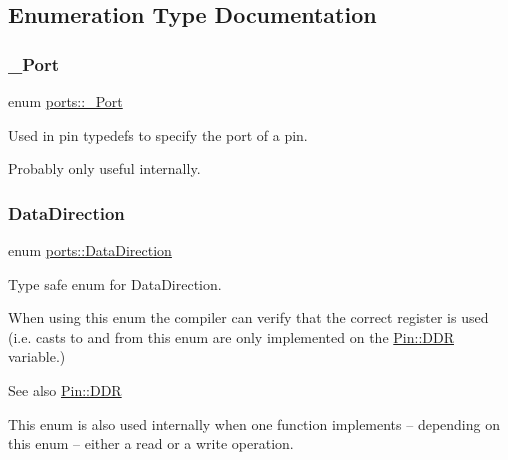 \subsection{Enumeration Type Documentation}
\hypertarget{namespaceports_a9949317f344930bd6ad1097e80c97b67}{}\label{namespaceports_a9949317f344930bd6ad1097e80c97b67} 
\subsubsection{\texorpdfstring{\+\_\+\+Port}{\_Port}}
{\footnotesize\ttfamily enum \hyperlink{namespaceports_a9949317f344930bd6ad1097e80c97b67}{ports\+::\+\_\+\+Port}\hspace{0.3cm}{\ttfamily [strong]}}



Used in pin {\ttfamily typedef}s to specify the port of a pin. 

Probably only useful internally. \hypertarget{namespaceports_a46987e78fa447129742fadda5eccafb4}{}\label{namespaceports_a46987e78fa447129742fadda5eccafb4} 
\subsubsection{\texorpdfstring{Data\+Direction}{DataDirection}}
{\footnotesize\ttfamily enum \hyperlink{namespaceports_a46987e78fa447129742fadda5eccafb4}{ports\+::\+Data\+Direction}\hspace{0.3cm}{\ttfamily [strong]}}



Type safe enum for Data\+Direction. 

When using this enum the compiler can verify that the correct register is used (i.\+e. casts to and from this enum are only implemented on the \hyperlink{structports_1_1Pin_aaebb4d6cb5db0635fe8e7d6e7d315c7f}{Pin\+::\+D\+DR} variable.)

\begin{DoxySeeAlso}{See also}
\hyperlink{structports_1_1Pin_aaebb4d6cb5db0635fe8e7d6e7d315c7f}{Pin\+::\+D\+DR}
\end{DoxySeeAlso}
This enum is also used internally when one function implements -- depending on this enum -- either a read or a write operation. \hypertarget{namespaceports_a49bf0ccedb4cfed89a328574e53bec07}{}\label{namespaceports_a49bf0ccedb4cfed89a328574e53bec07} 
